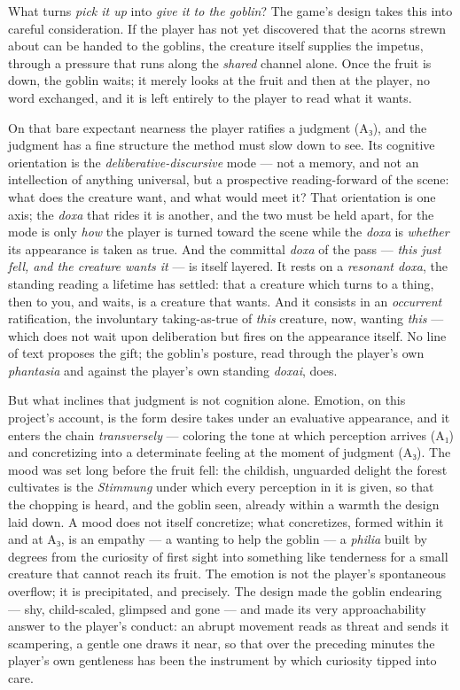 \documentclass{article}
\begin{document}
What turns \textit{pick it up} into \textit{give it to the goblin}? The game's design takes this into careful consideration. If the player has not yet discovered that the acorns strewn about can be handed to the goblins, the creature itself supplies the impetus, through a pressure that runs along the \textit{shared} channel alone. Once the fruit is down, the goblin waits; it merely looks at the fruit and then at the player, no word exchanged, and it is left entirely to the player to read what it wants.

On that bare expectant nearness the player ratifies a judgment (A₃), and the judgment has a fine structure the method must slow down to see. Its cognitive orientation is the \textit{deliberative-discursive} mode — not a memory, and not an intellection of anything universal, but a prospective reading-forward of the scene: what does the creature want, and what would meet it? That orientation is one axis; the \textit{doxa} that rides it is another, and the two must be held apart, for the mode is only \textit{how} the player is turned toward the scene while the \textit{doxa} is \textit{whether} its appearance is taken as true. And the committal \textit{doxa} of the pass — \textit{this just fell, and the creature wants it} — is itself layered. It rests on a \textit{resonant doxa}, the standing reading a lifetime has settled: that a creature which turns to a thing, then to you, and waits, is a creature that wants. And it consists in an \textit{occurrent} ratification, the involuntary taking-as-true of \textit{this} creature, now, wanting \textit{this} — which does not wait upon deliberation but fires on the appearance itself. No line of text proposes the gift; the goblin's posture, read through the player's own \textit{phantasia} and against the player's own standing \textit{doxai}, does.

But what inclines that judgment is not cognition alone. Emotion, on this project's account, is the form desire takes under an evaluative appearance, and it enters the chain \textit{transversely} — coloring the tone at which perception arrives (A₁) and concretizing into a determinate feeling at the moment of judgment (A₃). The mood was set long before the fruit fell: the childish, unguarded delight the forest cultivates is the \textit{Stimmung} under which every perception in it is given, so that the chopping is heard, and the goblin seen, already within a warmth the design laid down. A mood does not itself concretize; what concretizes, formed within it and at A₃, is an empathy — a wanting to help the goblin — a \textit{philia} built by degrees from the curiosity of first sight into something like tenderness for a small creature that cannot reach its fruit. The emotion is not the player's spontaneous overflow; it is precipitated, and precisely. The design made the goblin endearing — shy, child-scaled, glimpsed and gone — and made its very approachability answer to the player's conduct: an abrupt movement reads as threat and sends it scampering, a gentle one draws it near, so that over the preceding minutes the player's own gentleness has been the instrument by which curiosity tipped into care.
\end{document}
